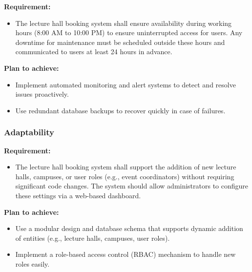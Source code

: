 \documentclass[a4paper,12pt]{article}
\begin{document}
\hspace{5mm}

\textbf{Requirement:} 

\begin{itemize}
    \item The lecture hall booking system shall ensure availability during working hours (8:00 AM to 10:00 PM) to ensure uninterrupted access for users. Any downtime for maintenance must be scheduled outside these hours and communicated to users at least 24 hours in advance.
\end{itemize}

\textbf{Plan to achieve:}
\begin{itemize}
\begin{itemize}
\begin{itemize}
    \item Implement automated monitoring and alert systems to detect and resolve issues proactively.
    \item Use redundant database backups to recover quickly in case of failures.
\end{itemize}

\end{itemize}

\end{itemize}

\subsubsection{Adaptability}

\hspace{5mm}

\textbf{Requirement:} 
\begin{itemize}
    \item The lecture hall booking system shall support the addition of new lecture halls, campuses, or user roles (e.g., event coordinators) without requiring significant code changes. The system should allow administrators to configure these settings via a web-based dashboard.
\end{itemize}

\textbf{Plan to achieve:}
\begin{itemize}

\begin{itemize}

\begin{itemize}
    \item Use a modular design and database schema that supports dynamic addition of entities (e.g., lecture halls, campuses, user roles).
    \item Implement a role-based access control (RBAC) mechanism to handle new roles easily.
\end{itemize}

\end{itemize}
\end{itemize}
\end{document}
